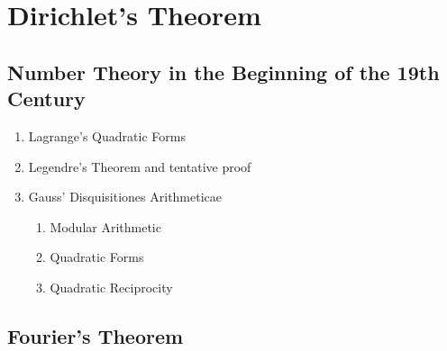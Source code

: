 \chapter{Dirichlet's Theorem}

\section{Number Theory in the Beginning of the 19th Century}

\td

\begin{enumerate}
    \item Lagrange's Quadratic Forms 
    \item Legendre's Theorem and tentative proof
    \item Gauss' Disquisitiones Arithmeticae
    \begin{enumerate}
        \item Modular Arithmetic
        \item Quadratic Forms 
        \item Quadratic Reciprocity 
    \end{enumerate}
\end{enumerate}

\noindent\td 

\section{Fourier's Theorem}

\td

